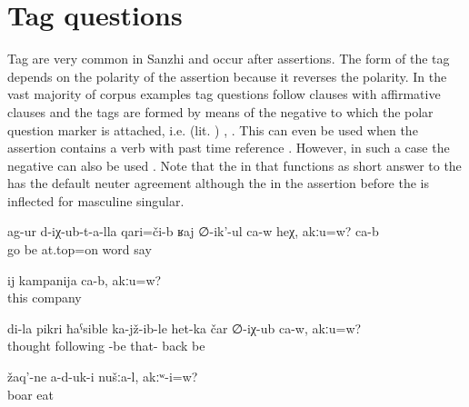 \section{Tag questions}
\label{sec:Tag questions}

Tag  are very common in Sanzhi and occur after assertions. The form of the tag depends on the polarity of the assertion because it reverses the polarity. In the vast majority of corpus examples tag questions follow clauses with affirmative clauses and the tags are formed by means of the negative   to which the polar question marker  is attached, i.e.  (lit. ) , . This  can even be used when the assertion contains a verb with past time reference . However, in such a case the negative   can also be used . Note that the  in  that functions as short answer to the  has the default neuter agreement although the  in the assertion before the  is inflected for masculine singular.

\begin{exe}
	\ex	\label{ex:About what had happened he is talking, right? Yes}
	\gll	ag-ur	d-iχ-ub-t-a-lla	qari=či-b 	ʁaj	∅-ik'-ul	ca-w	heχ,	akːu=w?	ca-b\\
		go	be	at.top=on	word	say				\\
	\glt	{}

	\ex	\label{ex:This is the company (group of friends), right}
	\gll	ij	kampanija	ca-b,	akːu=w?\\
		this	company		\\
	\glt	{}

	\ex	\label{ex:‎In my opinion, he was imprisoned and then came back from there, right}
	\gll	di-la	pikri	ħaˁsible	ka-jž-ib-le	het-ka	čar	∅-iχ-ub	ca-w,	akːu=w?\\
			thought	following	-be	that-	back be		\\
	\glt	{}

	\ex	\label{ex:‎We did not eat boars, right}
	\gll	žaq'-ne	a-d-uk-i	nušːa-l,	akːʷ-i=w?\\
		boar	eat			\\
	\glt	{}
\end{exe}

